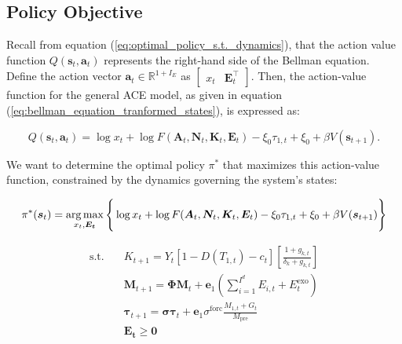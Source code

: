 \subsection{Policy Objective}

Recall from equation (\ref{eq:optimal_policy_s.t._dynamics}), that the action value function \(Q(\bm{s}_t, \bm{a}_t)\) represents the right-hand side of the Bellman equation. Define the action vector \(\bm{a}_t \in \mathbb{R}^{1+I_E}\) as \(\begin{bmatrix} x_t & \bm{E}_t^\top \end{bmatrix}\). Then, the action-value function for the general ACE model, as given in equation (\ref{eq:bellman_equation_tranformed_states}), is expressed as:

\begin{equation*}
    Q(\bm{s}_t, \bm{a}_t) = \log x_t + \log F(\bm{A}_t,\bm{N}_t,\bm{K}_t,\bm{E}_t) - \xi_0\tau_{1,t} + \xi_0 + \beta V(\bm{s}_{t+1}).
\end{equation*}

We want to determine the optimal policy \(\pi^*\) that maximizes this action-value function, constrained by the dynamics governing the system's states:

\begin{equation}
    \pi^*(\bm{s}_t) = \operatorname*{arg\,max}_{x_t, \bm{E_t}} 
        \Bigg\{ \log x_t 
        + \log F(\bm{A}_t,\bm{N}_t,\bm{K}_t,\bm{E}_t)
        - \xi_0\tau_{1,t} + \xi_0
        + \beta V(\bm{s}_{t+1}) \Bigg \}
\end{equation}

\begin{equation*}
\begin{aligned}
    \text{s.t.} \quad 
    & K_{t+1} = Y_t \left[ 1-D(T_{1,t}) - c_t \right]\left[\frac{1+g_{k,t}}{\delta_k + g_{k,t}} \right] \\
    & \bm{M}_{t+1} = \bm{\Phi} \bm{M}_t + \bm{e}_1\left (\sum_{i=1}^{I^d}E_{i,t} + E_t^{\text{exo}} \right) \\
    & \bm{\tau}_{t+1} = \bm{\sigma} \bm{\tau}_t +
        \bm{e}_1\sigma^{\text{forc}}\frac{M_{1,t}+G_t} {M_{\text{pre}}} \\
    & \bm{E_t} \geq \bm{0}
\end{aligned}
\end{equation*}

